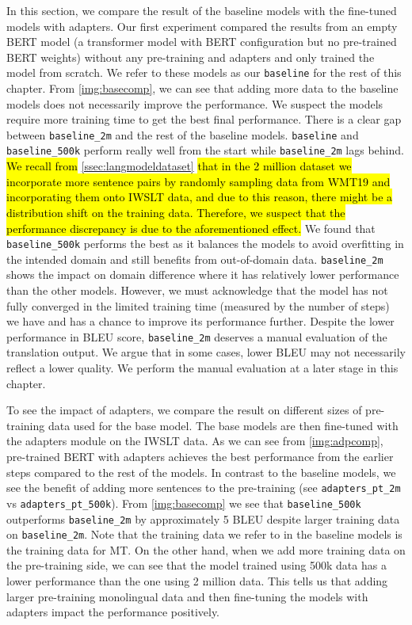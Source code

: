In this section, we compare the result of the baseline models with the fine-tuned models with adapters. Our first experiment compared the results from an empty BERT model (a transformer model with BERT configuration but no pre-trained BERT weights) without any pre-training and adapters and only trained the model from scratch. We refer to these models as our \texttt{baseline} for the rest of this chapter. From \cref{img:basecomp}, we can see that adding more data to the baseline models does not necessarily improve the performance. We suspect the models require more training time to get the best final performance. There is a clear gap between \texttt{baseline\_2m} and the rest of the baseline models. \texttt{baseline} and \texttt{baseline\_500k} perform really well from the start while \texttt{baseline\_2m} lags behind. 
\hl{We recall from} \cref{ssec:langmodeldataset} \hl{that in the 2 million dataset we incorporate more sentence pairs by randomly sampling data from WMT19 and incorporating them onto IWSLT data, and due to this reason, there might be a distribution shift on the training data. Therefore, we suspect that the performance discrepancy is due to the aforementioned effect.} 
We found that \texttt{baseline\_500k} performs the best as it balances the models to avoid overfitting in the intended domain and still benefits from out-of-domain data. \texttt{baseline\_2m} shows the impact on domain difference where it has relatively lower performance than the other models. However, we must acknowledge that the model has not fully converged in the limited training time (measured by the number of steps) we have and has a chance to improve its performance further. Despite the lower performance in BLEU score, \texttt{baseline\_2m} deserves a manual evaluation of the translation output. We argue that in some cases, lower BLEU may not necessarily reflect a lower quality. We perform the manual evaluation at a later stage in this chapter.

To see the impact of adapters, we compare the result on different sizes of pre-training data used for the base model. The base models are then fine-tuned with the adapters module on the IWSLT data. As we can see from \cref{img:adpcomp}, pre-trained BERT with adapters achieves the best performance from the earlier steps compared to the rest of the models. In contrast to the baseline models, we see the benefit of adding more sentences to the pre-training (see \texttt{adapters\_pt\_2m} vs \texttt{adapters\_pt\_500k}). From \cref{img:basecomp} we see that \texttt{baseline\_500k} outperforms \texttt{baseline\_2m} by approximately 5 BLEU despite larger training data on \texttt{baseline\_2m}. Note that the training data we refer to in the baseline models is the training data for MT. On the other hand, when we add more training data on the pre-training side, we can see that the model trained using 500k data has a lower performance than the one using 2 million data. This tells us that adding larger pre-training monolingual data and then fine-tuning the models with adapters impact the performance positively.

